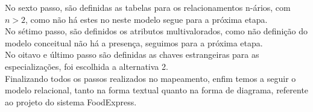 \documentclass[12pt, onecolumn, titlepage]{article}
\begin{document}
\newpage
No sexto passo, são definidas as tabelas para os relacionamentos n-ários, com $n > 2$, como não há estes no neste modelo segue para a próxima etapa.\\

No sétimo passo, são definidos os atributos multivalorados, como não definição do modelo conceitual não há a presença, seguimos para a próxima etapa.\\

No oitavo e último passo são definidas as chaves estrangeiras para as especializações, foi escolhida a alternativa 2.\\

Finalizando todos os passos realizados no mapeamento, enfim temos a seguir o modelo relacional, tanto na forma textual quanto na forma de diagrama, referente ao projeto do sistema FoodExpress.\\
\end{document}
